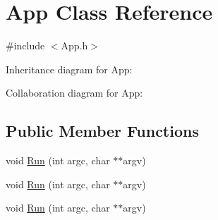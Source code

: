 \hypertarget{class_app}{\section{App Class Reference}
\label{class_app}
}


{\ttfamily \#include $<$App.\+h$>$}



Inheritance diagram for App\+:


Collaboration diagram for App\+:
\subsection*{Public Member Functions}
\begin{DoxyCompactItemize}
\item 
void \hyperlink{class_app_a92c5c3d8799fe937ea0179b4efb1f4d3}{Run} (int argc, char $\ast$$\ast$argv)
\item 
void \hyperlink{class_app_a92c5c3d8799fe937ea0179b4efb1f4d3}{Run} (int argc, char $\ast$$\ast$argv)
\item 
void \hyperlink{class_app_a92c5c3d8799fe937ea0179b4efb1f4d3}{Run} (int argc, char $\ast$$\ast$argv)
\end{DoxyCompactItemize}
